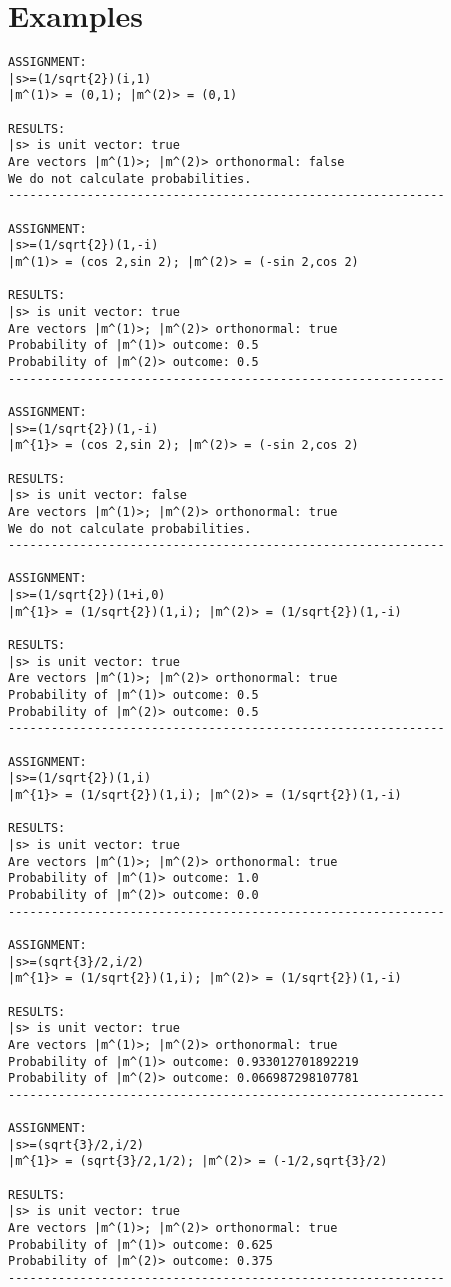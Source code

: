 \documentclass[11pt,letterpaper,oneside]{article}
\begin{document}
\section{Examples}
 \begin{verbatim}
ASSIGNMENT:
|s>=(1/sqrt{2})(i,1)
|m^(1)> = (0,1); |m^(2)> = (0,1)

RESULTS:
|s> is unit vector: true
Are vectors |m^(1)>; |m^(2)> orthonormal: false
We do not calculate probabilities.
-------------------------------------------------------------

ASSIGNMENT:
|s>=(1/sqrt{2})(1,-i)
|m^(1)> = (cos 2,sin 2); |m^(2)> = (-sin 2,cos 2)

RESULTS:
|s> is unit vector: true
Are vectors |m^(1)>; |m^(2)> orthonormal: true
Probability of |m^(1)> outcome: 0.5
Probability of |m^(2)> outcome: 0.5
-------------------------------------------------------------

ASSIGNMENT:
|s>=(1/sqrt{2})(1,-i)
|m^{1}> = (cos 2,sin 2); |m^(2)> = (-sin 2,cos 2)

RESULTS:
|s> is unit vector: false
Are vectors |m^(1)>; |m^(2)> orthonormal: true
We do not calculate probabilities.
-------------------------------------------------------------

ASSIGNMENT:
|s>=(1/sqrt{2})(1+i,0)
|m^{1}> = (1/sqrt{2})(1,i); |m^(2)> = (1/sqrt{2})(1,-i)

RESULTS:
|s> is unit vector: true
Are vectors |m^(1)>; |m^(2)> orthonormal: true
Probability of |m^(1)> outcome: 0.5
Probability of |m^(2)> outcome: 0.5
-------------------------------------------------------------

ASSIGNMENT:
|s>=(1/sqrt{2})(1,i)
|m^{1}> = (1/sqrt{2})(1,i); |m^(2)> = (1/sqrt{2})(1,-i)

RESULTS:
|s> is unit vector: true
Are vectors |m^(1)>; |m^(2)> orthonormal: true
Probability of |m^(1)> outcome: 1.0
Probability of |m^(2)> outcome: 0.0
-------------------------------------------------------------

ASSIGNMENT:
|s>=(sqrt{3}/2,i/2)
|m^{1}> = (1/sqrt{2})(1,i); |m^(2)> = (1/sqrt{2})(1,-i)

RESULTS:
|s> is unit vector: true
Are vectors |m^(1)>; |m^(2)> orthonormal: true
Probability of |m^(1)> outcome: 0.933012701892219
Probability of |m^(2)> outcome: 0.066987298107781
-------------------------------------------------------------

ASSIGNMENT:
|s>=(sqrt{3}/2,i/2)
|m^{1}> = (sqrt{3}/2,1/2); |m^(2)> = (-1/2,sqrt{3}/2)

RESULTS:
|s> is unit vector: true
Are vectors |m^(1)>; |m^(2)> orthonormal: true
Probability of |m^(1)> outcome: 0.625
Probability of |m^(2)> outcome: 0.375
-------------------------------------------------------------



  \end{verbatim}
\end{document}
